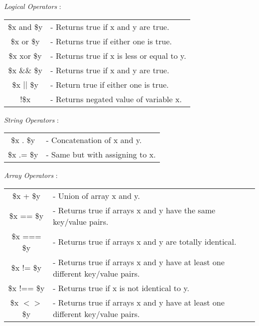 \documentclass{article}
\begin{document}
\textit{Logical Operators} : \\
\begin{tabular}{c l}
\hspace{1cm} \$x and \$y & - Returns true if x and y are true.\\
\hspace{1cm} \$x or \$y & - Returns true if either one is true.\\
\hspace{1cm} \$x xor \$y & - Returns true if x is less or equal to y.\\
\hspace{1cm} \$x \&\& \$y & - Returns true if x and y are true.\\
\hspace{1cm} \$x $||$ \$y & - Return true if either one is true.\\
\hspace{1cm} !\$x & - Returns negated value of variable x.\\
\end{tabular}
\vspace{.5cm}
\hfill\newline
\textit{String Operators} : \\
\begin{tabular}{c l}
\hspace{1cm} \$x . \$y & - Concatenation of x and y.\\
\hspace{1cm} \$x .= \$y & - Same but with assigning to x.\\
\end{tabular}
\vspace{.5cm}
\hfill\newline
\textit{Array Operators} : \\
\begin{tabular}{c l}
\hspace{1cm} \$x + \$y & - Union of array x and y.\\
\hspace{1cm} \$x == \$y & - Returns true if arrays x and y have the same key/value pairs.\\
\hspace{1cm} \$x === \$y & - Returns true if arrays x and y are totally identical.\\
\hspace{1cm} \$x != \$y & - Returns true if arrays x and y have at least one different key/value pairs.\\
\hspace{1cm} \$x !== \$y & - Returns true if x is not identical to y.\\
\hspace{1cm} \$x $<>$ \$y & - Returns true if arrays x and y have at least one different key/value pairs.\\
\end{tabular}
\pagebreak
\end{document}
